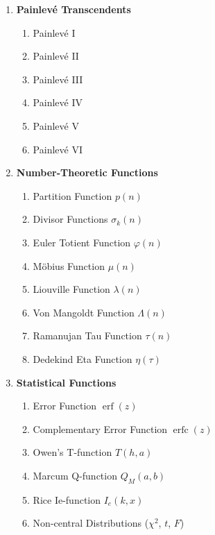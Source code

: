\begin{enumerate}[label=\textbf{\arabic*.}]
	\item \textbf{Painlevé Transcendents}
	\begin{enumerate}[label=\textbf{\alph*)}]
		\item Painlevé I
		\item Painlevé II
		\item Painlevé III
		\item Painlevé IV
		\item Painlevé V
		\item Painlevé VI
	\end{enumerate}
	
	\item \textbf{Number-Theoretic Functions}
	\begin{enumerate}[label=\textbf{\alph*)}]
		\item Partition Function $p(n)$
		\item Divisor Functions $\sigma_k(n)$
		\item Euler Totient Function $\varphi(n)$
		\item Möbius Function $\mu(n)$
		\item Liouville Function $\lambda(n)$
		\item Von Mangoldt Function $\Lambda(n)$
		\item Ramanujan Tau Function $\tau(n)$
		\item Dedekind Eta Function $\eta(\tau)$
	\end{enumerate}
	
	\item \textbf{Statistical Functions}
	\begin{enumerate}[label=\textbf{\alph*)}]
		\item Error Function $\operatorname{erf}(z)$
		\item Complementary Error Function $\operatorname{erfc}(z)$
		\item Owen's T-function $T(h,a)$
		\item Marcum Q-function $Q_M(a,b)$
		\item Rice Ie-function $I_e(k,x)$
		\item Non-central Distributions ($\chi^2$, $t$, $F$)
	\end{enumerate}
	

\end{enumerate}
